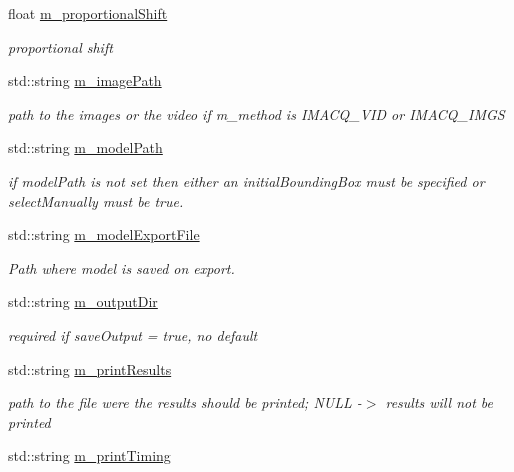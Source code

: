 \begin{DoxyCompactItemize}
float \hyperlink{classtld_1_1_settings_afcb52ecca38e4e236a66c3f36ec7cdbf}{m\_\-proportionalShift}
\begin{DoxyCompactList}\small\item\em proportional shift \item\end{DoxyCompactList}\item 
std::string \hyperlink{classtld_1_1_settings_abfd40dee05d0005e6cdaab2e0a84a4a9}{m\_\-imagePath}
\begin{DoxyCompactList}\small\item\em path to the images or the video if m\_\-method is IMACQ\_\-VID or IMACQ\_\-IMGS \item\end{DoxyCompactList}\item 
std::string \hyperlink{classtld_1_1_settings_ac09a844a6ee9727f04e2de086f4fa9ce}{m\_\-modelPath}
\begin{DoxyCompactList}\small\item\em if modelPath is not set then either an initialBoundingBox must be specified or selectManually must be true. \item\end{DoxyCompactList}\item 
std::string \hyperlink{classtld_1_1_settings_a2fb70f5b39e773b64d62f902009827fc}{m\_\-modelExportFile}
\begin{DoxyCompactList}\small\item\em Path where model is saved on export. \item\end{DoxyCompactList}\item 
std::string \hyperlink{classtld_1_1_settings_a8893600d99c4d096e384e4aeff2155f7}{m\_\-outputDir}
\begin{DoxyCompactList}\small\item\em required if saveOutput = true, no default \item\end{DoxyCompactList}\item 
std::string \hyperlink{classtld_1_1_settings_a214e9008680cab432e095e5d07372dd1}{m\_\-printResults}
\begin{DoxyCompactList}\small\item\em path to the file were the results should be printed; NULL -\/$>$ results will not be printed \item\end{DoxyCompactList}\item 
std::string \hyperlink{classtld_1_1_settings_af986bcadbc3f34693dd13191bbf65947}{m\_\-printTiming}

\end{DoxyCompactItemize}
